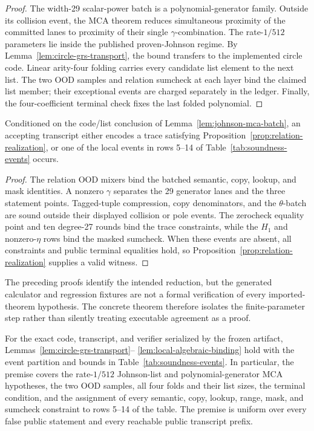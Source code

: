 \begin{proof}
The width-29 scalar-power batch is a polynomial-generator family.  Outside
its collision event, the MCA theorem reduces simultaneous proximity of the
committed lanes to proximity of their single \(\gamma\)-combination.  The
rate-\(1/512\) parameters lie inside the published proven-Johnson regime.  By
Lemma~\ref{lem:circle-grs-transport}, the bound transfers to the implemented
circle code.  Linear arity-four folding carries every candidate list element
to the next list.  The two OOD samples and relation sumcheck at each layer
bind the claimed list member; their exceptional events are charged
separately in the ledger.  Finally, the four-coefficient terminal check fixes
the last folded polynomial.
\end{proof}

\begin{lemma}
\label{lem:local-algebraic-binding}
Conditioned on the code/list conclusion of
Lemma~\ref{lem:johnson-mca-batch}, an accepting transcript either encodes a
trace satisfying Proposition~\ref{prop:relation-realization}, or one of the
local events in rows 5--14 of Table~\ref{tab:soundness-events} occurs.
\end{lemma}

\begin{proof}
The relation OOD mixers bind the batched semantic, copy, lookup, and mask
identities.  A nonzero \(\gamma\) separates the 29 generator lanes and the
three statement points.  Tagged-tuple compression, copy denominators, and the
\(\theta\)-batch are sound outside their displayed collision or pole events.
The zerocheck equality point and ten degree-27 rounds bind the trace
constraints, while the \(H_1\) and nonzero-\(\eta\) rows bind the masked
sumcheck.  When these events are absent, all constraints and public terminal
equalities hold, so Proposition~\ref{prop:relation-realization} supplies a
valid witness.
\end{proof}

The preceding proofs identify the intended reduction, but the generated
calculator and regression fixtures are not a formal verification of every
imported-theorem hypothesis.  The concrete theorem therefore isolates the
finite-parameter step rather than silently treating executable agreement as
a proof.

\begin{assumption}
\label{ass:pinned-finite-reduction}
For the exact code, transcript, and verifier serialized by the frozen
artifact, Lemmas~\ref{lem:circle-grs-transport}--
\ref{lem:local-algebraic-binding} hold with the event partition and bounds in
Table~\ref{tab:soundness-events}.  In particular, the premise covers the
rate-\(1/512\) Johnson-list and polynomial-generator MCA hypotheses, the two
OOD samples, all four folds and their list sizes, the terminal condition, and
the assignment of every semantic, copy, lookup, range, mask, and sumcheck
constraint to rows 5--14 of the table.  The premise is uniform over every
false public statement and every reachable public transcript prefix.
\end{assumption}

